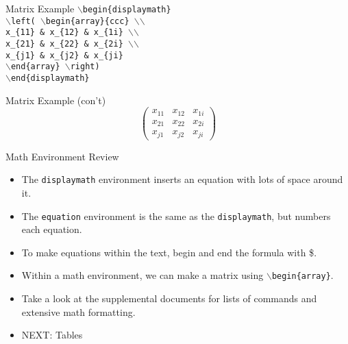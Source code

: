 \documentclass[pdf]{prosper}
\begin{document}
\begin{slide}{Matrix Example}
	\texttt{$\backslash$begin\{displaymath\}} \\
	\texttt{$\backslash$left( $\backslash$begin\{array\}\{ccc\} $\backslash$$\backslash$} \\
	\texttt{x\_\{11\} \& x\_\{12\} \& x\_\{1i\} $\backslash$$\backslash$} \\
	\texttt{x\_\{21\} \& x\_\{22\} \& x\_\{2i\} $\backslash$$\backslash$} \\
	\texttt{x\_\{j1\} \& x\_\{j2\} \& x\_\{ji\}} \\
	\texttt{$\backslash$end\{array\} $\backslash$right)} \\
	\texttt{$\backslash$end\{displaymath\}}
\end{slide}
\begin{slide}{Matrix Example (con't)}
	\begin{displaymath}
	\left( \begin{array}{ccc}
	x_{11} & x_{12} & x_{1i} \\
	x_{21} & x_{22} & x_{2i} \\
	x_{j1} & x_{j2} & x_{ji}
	\end{array} \right)
	\end{displaymath}
\end{slide}
\begin{slide}{Math Environment Review}
	\begin{itemize}
		\item The \texttt{displaymath} environment inserts an equation with lots of space around it.
		\item The \texttt{equation} environment is the same as the \texttt{displaymath}, but numbers each equation.
		\item To make equations within the text, begin and end the formula with \$.
		\item Within a math environment, we can make a matrix using \texttt{$\backslash$begin\{array\}}.
		\item Take a look at the supplemental documents for lists of commands and extensive math formatting.
		\item NEXT: Tables
	\end{itemize}
\end{slide}
\end{document}
